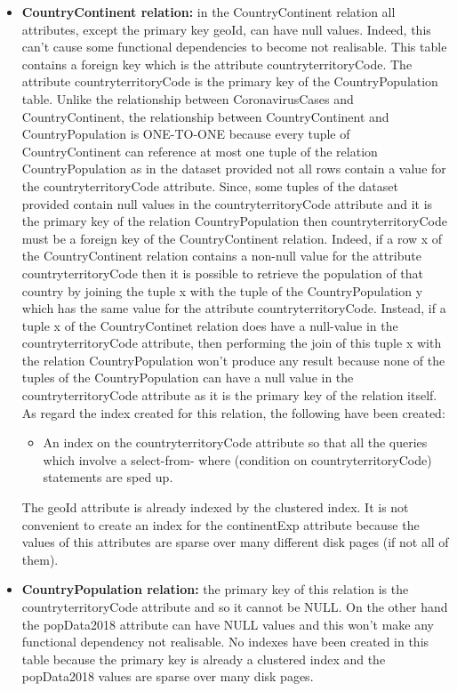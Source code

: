 \documentclass{article}
\begin{document}
\begin{itemize}
\item \textbf{CountryContinent relation:} in the CountryContinent relation all attributes, except the primary key geoId, can have null values. Indeed, this can’t cause some functional dependencies to become not realisable. This table contains a foreign key which is the attribute countryterritoryCode. The attribute
countryterritoryCode is the primary key of the CountryPopulation table. Unlike the relationship
between CoronavirusCases and CountryContinent, the relationship between CountryContinent and CountryPopulation is ONE-TO-ONE because every tuple of CountryContinent can reference at most one tuple of the relation CountryPopulation as in the dataset provided not all rows contain a value for the countryterritoryCode attribute. Since, some tuples of the dataset provided contain null values in the countryterritoryCode
attribute and it is the primary key of the relation CountryPopulation then countryterritoryCode must
be a foreign key of the CountryContinent relation. Indeed, if a row x of the CountryContinent relation
contains a non-null value for the attribute countryterritoryCode then it is possible to retrieve the
population of that country by joining the tuple x with the tuple of the CountryPopulation y which has
the same value for the attribute countryterritoryCode. Instead, if a tuple x of the CountryContinet
relation does have a null-value in the countryterritoryCode attribute, then performing the join of this
tuple x with the relation CountryPopulation won’t produce any result because none of the tuples of the
CountryPopulation can have a null value in the countryterritoryCode attribute as it is the primary
key of the relation itself. As regard the index created for this relation, the following have been created:
\begin{itemize}
    \item An index on the countryterritoryCode attribute so that all the queries which involve a select-from-
where (condition on countryterritoryCode) statements are sped up.
\end{itemize}
The geoId attribute is already indexed by the clustered index. It is not convenient to create an index for
the continentExp attribute because the values of this attributes are sparse over many different disk pages
(if not all of them).
\item \textbf{CountryPopulation relation:} the primary key of this relation is the countryterritoryCode attribute
and so it cannot be NULL. On the other hand the popData2018 attribute can have NULL values and
this won’t make any functional dependency not realisable. No indexes have been created in this table
because the primary key is already a clustered index and the popData2018 values are sparse over many disk pages.
\end{itemize}
\end{document}
